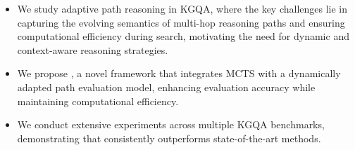 \begin{itemize}[itemsep=2pt,topsep=0pt,parsep=0pt,leftmargin=*]
\item We study adaptive path reasoning in KGQA, where the key challenges lie in capturing the evolving semantics of multi-hop reasoning paths and ensuring computational efficiency during search, motivating the need for dynamic and context-aware reasoning strategies.
\item We propose \method{}, a novel framework that integrates MCTS with a dynamically adapted path evaluation model, enhancing evaluation accuracy while maintaining computational efficiency.
\item We conduct extensive experiments across multiple KGQA benchmarks, demonstrating that \method{} consistently outperforms state-of-the-art methods.
\end{itemize}
